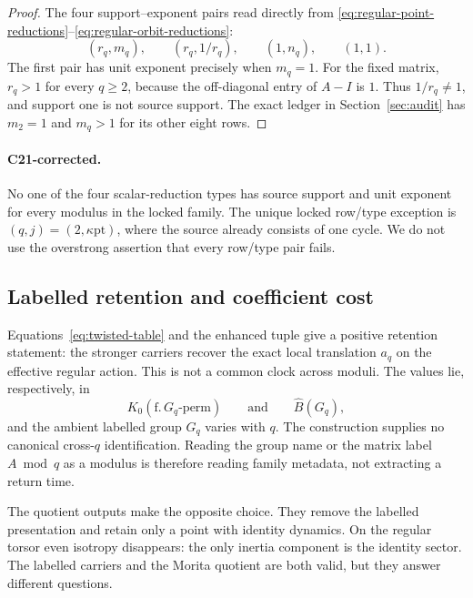 \documentclass[11pt]{article}
\theoremstyle{definition}
\theoremstyle{remark}
\begin{document}
\begin{proof}
The four support--exponent pairs read directly from
\eqref{eq:regular-point-reductions}--\eqref{eq:regular-orbit-reductions}:
\begin{equation}
  (r_q,m_q),\qquad
  (r_q,1/r_q),\qquad
  (1,n_q),\qquad
  (1,1).
  \label{eq:four-support-exponent-pairs}
\end{equation}
The first pair has unit exponent precisely when \(m_q=1\).  For the fixed
matrix, \(r_q>1\) for every \(q\ge2\), because the off-diagonal entry of
\(A-I\) is \(1\).  Thus \(1/r_q\ne1\), and support one is not source support.
The exact ledger in Section~\ref{sec:audit} has \(m_2=1\) and
\(m_q>1\) for its other eight rows.
\end{proof}

\paragraph{C21-corrected.}
No one of the four scalar-reduction types has source support and unit
exponent for every modulus in the locked family.  The unique locked
row/type exception is \((q,j)=(2,\kappa\mathrm{pt})\), where the source
already consists of one cycle.  We do not use the overstrong assertion that
every row/type pair fails.

\subsection{Labelled retention and coefficient cost}

Equations~\eqref{eq:twisted-table} and the enhanced tuple give a positive
retention statement: the stronger carriers recover the exact local
translation \(a_q\) on the effective regular action.  This is not a common
clock across moduli.  The values lie, respectively, in
\[
  K_0(\mathrm{f.}\,G_q\text{-perm})
  \qquad\text{and}\qquad
  \widehat B(G_q),
\]
and the ambient labelled group \(G_q\) varies with \(q\).  The construction
supplies no canonical cross-\(q\) identification.  Reading the group name or
the matrix label \(A\bmod q\) as a modulus is therefore reading family
metadata, not extracting a return time.

The quotient outputs make the opposite choice.  They remove the labelled
presentation and retain only a point with identity dynamics.  On the regular
torsor even isotropy disappears: the only inertia component is the identity
sector.  The labelled carriers and the Morita quotient are both valid, but
they answer different questions.
\end{document}
